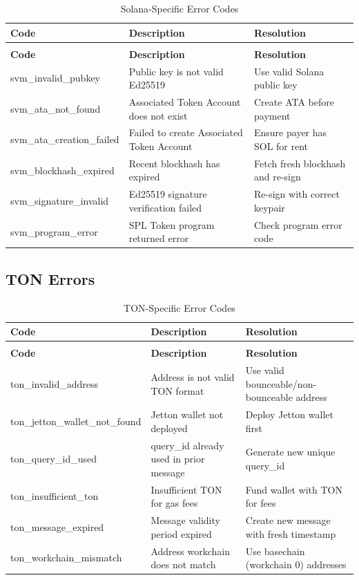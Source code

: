\begin{longtable}{>{\ttfamily\footnotesize}l p{5cm} p{4cm}}
\caption{Solana-Specific Error Codes} \label{tab:solana-errors} \\
\toprule
\normalfont\textbf{Code} & \textbf{Description} & \textbf{Resolution} \\
\midrule
\endfirsthead
\multicolumn{3}{c}{\tablename\ \thetable\ -- continued} \\
\toprule
\normalfont\textbf{Code} & \textbf{Description} & \textbf{Resolution} \\
\midrule
\endhead
\midrule
\endfoot
\bottomrule
\endlastfoot
svm\_invalid\_pubkey & Public key is not valid Ed25519 & Use valid Solana public key \\
svm\_ata\_not\_found & Associated Token Account does not exist & Create ATA before payment \\
svm\_ata\_creation\_failed & Failed to create Associated Token Account & Ensure payer has SOL for rent \\
svm\_blockhash\_expired & Recent blockhash has expired & Fetch fresh blockhash and re-sign \\
svm\_signature\_invalid & Ed25519 signature verification failed & Re-sign with correct keypair \\
svm\_program\_error & SPL Token program returned error & Check program error code \\
\end{longtable}

\subsection{TON Errors}

\begin{longtable}{>{\ttfamily\footnotesize}l p{5cm} p{4cm}}
\caption{TON-Specific Error Codes} \label{tab:ton-errors} \\
\toprule
\normalfont\textbf{Code} & \textbf{Description} & \textbf{Resolution} \\
\midrule
\endfirsthead
\multicolumn{3}{c}{\tablename\ \thetable\ -- continued} \\
\toprule
\normalfont\textbf{Code} & \textbf{Description} & \textbf{Resolution} \\
\midrule
\endhead
\midrule
\endfoot
\bottomrule
\endlastfoot
ton\_invalid\_address & Address is not valid TON format & Use valid bounceable/non-bounceable address \\
ton\_jetton\_wallet\_not\_found & Jetton wallet not deployed & Deploy Jetton wallet first \\
ton\_query\_id\_used & query\_id already used in prior message & Generate new unique query\_id \\
ton\_insufficient\_ton & Insufficient TON for gas fees & Fund wallet with TON for fees \\
ton\_message\_expired & Message validity period expired & Create new message with fresh timestamp \\
ton\_workchain\_mismatch & Address workchain does not match & Use basechain (workchain 0) addresses \\
\end{longtable}

